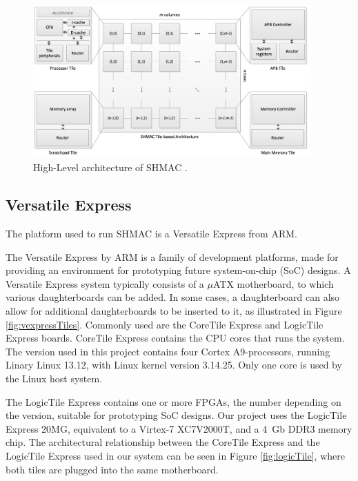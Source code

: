 \begin{figure}[htb]
    \centering
    \includegraphics[width=0.95\textwidth]{Figures/Heterogeneous/SHMAC}
    \caption{High-Level architecture of SHMAC \cite{shmac-plan}.}
    \label{fig:shmac}
\end{figure}

\subsection{Versatile Express}

The platform used to run SHMAC is a Versatile Express from ARM.

The Versatile Express by ARM is a family of development platforms, made for providing an environment for prototyping future system-on-chip (SoC) designs.
A Versatile Express system typically consists of a $\mu$ATX motherboard, to which various daughterboards can be added.
In some cases, a daughterboard can also allow for additional daughterboards to be inserted to it, as illustrated in Figure \ref{fig:vexpressTiles}. 
Commonly used are the CoreTile Express and LogicTile Express boards. 
CoreTile Express contains the CPU cores that runs the system. The version used in this project contains four Cortex A9-processors, running Linary Linux 13.12,
with Linux kernel version 3.14.25.
Only one core is used by the Linux host system.

The LogicTile Express contains one or more FPGAs, the number depending on the version, suitable for prototyping SoC designs.
Our project uses the LogicTile Express 20MG, equivalent to a Virtex-7 XC7V2000T, and a 4~Gb DDR3 memory chip.
The architectural relationship between the CoreTile Express and the LogicTile Express used in our system can be seen in Figure \ref{fig:logicTile}, where both tiles are plugged into the same motherboard. \cite{VexpressHomepage,LogicTileDataSheet}

